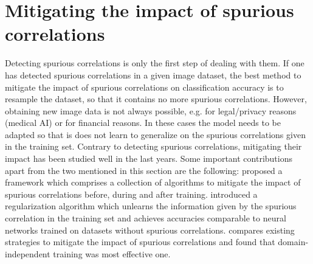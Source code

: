 \documentclass{article}
\begin{document}
\section{Mitigating the impact of spurious correlations}
\label{sec:mitigatingscs}
Detecting spurious correlations is only the first step of dealing with them. If one has detected
spurious correlations in a given image dataset, the best method to mitigate the impact of spurious correlations
on classification accuracy is to resample the dataset, so that it contains no more spurious correlations.
However, obtaining new image data is not always possible, e.g. for legal/privacy reasons (medical AI) or for
financial reasons. In these cases the model needs to be adapted so that is does not learn to generalize on the
spurious correlations given in the training set. Contrary to detecting spurious correlations, mitigating their
impact has been studied well in the last years. Some important contributions apart from the two mentioned in
this section are the following: \cite{bellamy2018ai} proposed a framework which comprises a collection of algorithms
to mitigate the impact of spurious correlations before, during and after training. \cite{Kim_2019_CVPR} introduced a 
regularization algorithm which unlearns the information given by the spurious correlation in the training set and achieves accuracies
comparable to neural networks trained on datasets without spurious correlations. \cite{Wang_2020_CVPR} compares existing strategies
to mitigate the impact of spurious correlations and found that domain-independent training was most effective one.
\end{document}
